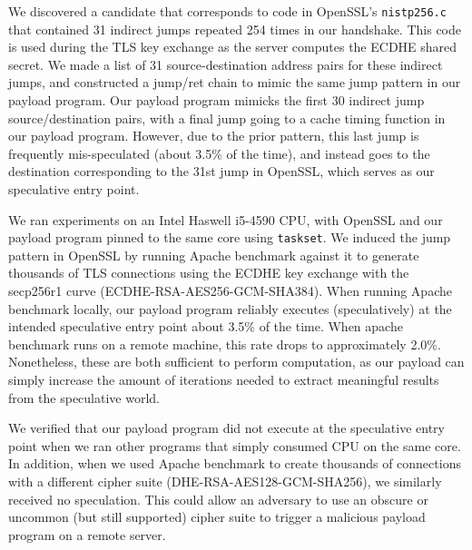 We discovered a candidate that corresponds to code in OpenSSL's
\texttt{nistp256.c} that contained 31 indirect jumps repeated 254 times in our
handshake. This code is used during the TLS key exchange as the server computes
the ECDHE shared secret. We made a list of 31 source-destination address pairs
for these indirect jumps, and constructed a jump/ret chain to mimic the same
jump pattern in
our payload program. Our payload program mimicks the first 30 indirect jump
source/destination pairs, with a final jump going to a cache timing function
in our payload program. However, due to the prior pattern, this last jump is
frequently mis-speculated (about 3.5\% of the time), and instead goes to the
destination corresponding to the 31st jump in OpenSSL, which serves as our
speculative entry point.


We ran experiments on an Intel Haswell
i5-4590 CPU, with OpenSSL and our payload program pinned to the same core using
\texttt{taskset}.
We induced the jump pattern in OpenSSL by running Apache benchmark against it to
generate thousands of TLS connections using the ECDHE key exchange with the
secp256r1 curve (ECDHE-RSA-AES256-GCM-SHA384). When running Apache benchmark locally, our payload program
reliably executes (speculatively) at the intended speculative entry point
about 3.5\% of the time. When apache benchmark runs on a remote
machine, this rate drops to approximately 2.0\%. Nonetheless, these are both
sufficient to perform computation, as our payload can simply increase the amount
of iterations needed to extract meaningful results from the speculative world.

We verified that our payload program did not execute at the speculative entry
point when we ran
other programs that simply consumed CPU on the same core. In addition, when we used
Apache benchmark to create thousands of connections with a different cipher
suite (DHE-RSA-AES128-GCM-SHA256), we similarly received no speculation. This
could allow an adversary to use an obscure or uncommon (but still
supported) cipher suite to trigger a malicious \speculake payload program on a remote server.

